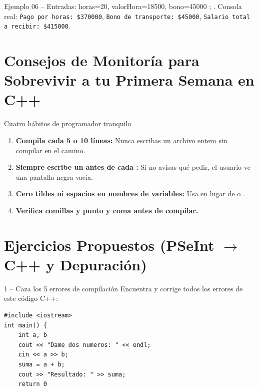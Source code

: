 \documentclass[11pt,letterpaper]{article}
\begin{document}



\begin{pruebaescritorio}{Ejemplo 06 -- Entradas: horas=20, valorHora=18500, bono=45000}
; . Consola real: \texttt{Pago por horas: \$370000}, \texttt{Bono de transporte: \$45000}, \texttt{Salario total a recibir: \$415000}.
\end{pruebaescritorio}

\section{Consejos de Monitoría para Sobrevivir a tu Primera Semana en C++}

\begin{consejo}{Cuatro hábitos de programador tranquilo}
\begin{enumerate}
  \item \textbf{Compila cada 5 o 10 líneas:} Nunca escribas un archivo entero sin compilar en el camino.
  \item \textbf{Siempre escribe un  antes de cada :} Si no avisas qué pedir, el usuario ve una pantalla negra vacía.
  \item \textbf{Cero tildes ni espacios en nombres de variables:} Usa  en lugar de  o .
  \item \textbf{Verifica comillas y punto y coma antes de compilar.}
\end{enumerate}
\end{consejo}

\section{Ejercicios Propuestos (PSeInt \texorpdfstring{$\rightarrow$}{->} C++ y Depuración)}

\begin{ejercicio}{1 -- Caza los 5 errores de compilación}
Encuentra y corrige todos los errores de este código C++:
\begin{lstlisting}[style=cppmonitoria,numbers=none]
#include <iostream>
int main() {
    int a, b
    cout << "Dame dos numeros: " << endl;
    cin << a >> b;
    suma = a + b;
    cout >> "Resultado: " >> suma;
    return 0
\end{lstlisting}
\end{ejercicio}
\end{document}
